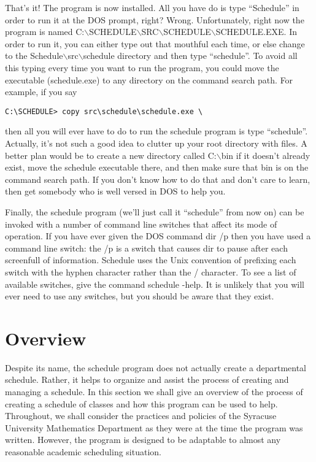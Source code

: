 That's it! The program is now installed. All you have do is type ``Schedule''
in order to run it at the DOS prompt, right? Wrong. Unfortunately, right
now the program is named C:$\backslash${SCHEDULE}$\backslash${SRC}$\backslash${SCHEDULE}$\backslash${SCHEDULE.EXE}. In order
to run it, you can either type out that mouthful each time, or else change
to the Schedule$\backslash${src}$\backslash${schedule} directory
 and then type ``schedule''. To
avoid all this typing every time you want to run the program, you could 
move the executable (schedule.exe) to any directory on the command search
path. For example, if you say
\smallskip
\begin{verbatim}
C:\SCHEDULE> copy src\schedule\schedule.exe \
\end{verbatim}
\smallskip
then all you will ever have to do to run the schedule program is type ``schedule''. Actually, it's not such a good idea to clutter up your root
directory with files. A better plan would be to create a new directory
called C:$\backslash${bin} if it doesn't already exist, move the schedule executable there,
and then make sure that bin is on the command search path. If you don't know
how to do that and don't care to learn, then get somebody who is well versed
in DOS to help you.

Finally, the schedule program (we'll just call it ``schedule'' from now
on) can be invoked with a number of command line switches that affect its
mode of operation. If you have ever given the DOS command dir /p then you
have used a command line switch: the /p is a switch that causes dir to pause after
each screenfull of information. Schedule uses the Unix convention of 
prefixing each switch with the hyphen character rather than the / character.
To see a list of available switches, give the command schedule -help. It is
unlikely that you will ever need to use any switches, but you should be
aware that they exist.

\section{Overview}
Despite its name, the schedule program does not actually create a departmental
schedule. Rather, it helps to organize and assist the process of creating
and managing a schedule. In this section we shall give an overview of the
process of creating a schedule of classes and how this program can be used
to help. Throughout, we shall consider the practices and policies of the
Syracuse University Mathematics Department as they were at the time the
program was written. However, the program is designed to be adaptable to 
almost any reasonable academic scheduling situation.


